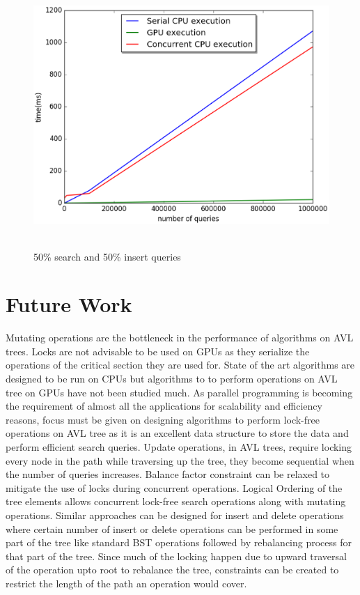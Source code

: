 \documentclass[MTech]{iitmdiss}
\begin{document}
\begin{figure}[H]
\centering 
\includegraphics[width=13cm,height=10cm]{s_i_d_50_50_0}
\caption{50\% search and 50\% insert queries}
\label{fig:sid_50_50_0}
\end{figure}


\chapter{Future Work}
\label{chap:future_work}
Mutating operations are the bottleneck in the performance of algorithms on AVL trees. Locks are not advisable to be used on GPUs as they serialize the operations of the critical section they are used for. State of the art algorithms are designed to be run on CPUs but algorithms to to perform operations on AVL tree on GPUs have not been studied much. As parallel programming is becoming the requirement of almost all the applications for scalability and efficiency reasons, focus must be given on designing algorithms to perform lock-free operations on AVL tree as it is an excellent data structure to store the data and perform efficient search queries. Update operations, in AVL trees, require locking every node in the path while traversing up the tree, they become sequential when the number of queries increases. Balance factor constraint can be relaxed to mitigate the use of locks during concurrent operations. Logical Ordering of the tree elements allows concurrent lock-free search operations along with mutating operations. Similar approaches can be designed for insert and delete operations where certain number of insert or delete operations can be performed in some part of the tree like standard BST operations followed by rebalancing process for that part of the tree. Since much of the locking happen due to upward traversal of the operation upto root to rebalance the tree, constraints can be created to restrict the length of the path an operation would cover.
\end{document}
